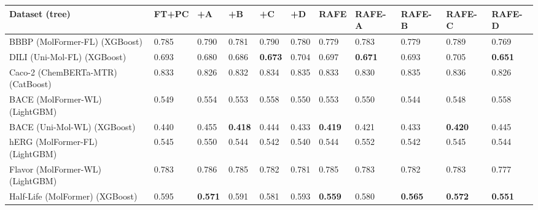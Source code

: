 \begin{tabular}{lllllllllll}
\toprule
Dataset (tree) & FT+PC & +A & +B & +C & +D & RAFE & RAFE-A & RAFE-B & RAFE-C & RAFE-D \\
\midrule
BBBP (MolFormer-FL) (XGBoost) & 0.785 & 0.790 & 0.781 & 0.790 & 0.780 & 0.779 & 0.783 & 0.779 & 0.789 & 0.769 \\
DILI (Uni-Mol-FL) (XGBoost) & 0.693 & 0.680 & 0.686 & \textbf{0.673} & 0.704 & 0.697 & \textbf{0.671} & 0.693 & 0.705 & \textbf{0.651} \\
Caco-2 (ChemBERTa-MTR) (CatBoost) & 0.833 & 0.826 & 0.832 & 0.834 & 0.835 & 0.833 & 0.830 & 0.835 & 0.836 & 0.826 \\
BACE (MolFormer-WL) (LightGBM) & 0.549 & 0.554 & 0.553 & 0.558 & 0.550 & 0.553 & 0.550 & 0.544 & 0.548 & 0.558 \\
BACE (Uni-Mol-WL) (XGBoost) & 0.440 & 0.455 & \textbf{0.418} & 0.444 & 0.433 & \textbf{0.419} & 0.421 & 0.433 & \textbf{0.420} & 0.445 \\
hERG (MolFormer-FL) (LightGBM) & 0.545 & 0.550 & 0.544 & 0.542 & 0.540 & 0.544 & 0.552 & 0.542 & 0.545 & 0.544 \\
Flavor (MolFormer-WL) (LightGBM) & 0.783 & 0.786 & 0.785 & 0.782 & 0.781 & 0.785 & 0.783 & 0.782 & 0.783 & 0.777 \\
Half-Life (MolFormer) (XGBoost) & 0.595 & \textbf{0.571} & 0.591 & 0.581 & 0.593 & \textbf{0.559} & 0.580 & \textbf{0.565} & \textbf{0.572} & \textbf{0.551} \\
\bottomrule
\end{tabular}

